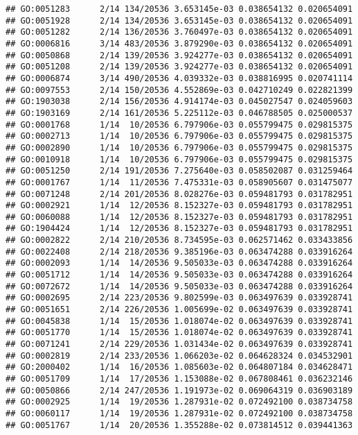 \documentclass[
]{article}
\begin{document}
\begin{verbatim}
## GO:0051283      2/14 134/20536 3.653145e-03 0.038654132 0.020654091
## GO:0051928      2/14 134/20536 3.653145e-03 0.038654132 0.020654091
## GO:0051282      2/14 136/20536 3.760497e-03 0.038654132 0.020654091
## GO:0006816      3/14 483/20536 3.879290e-03 0.038654132 0.020654091
## GO:0050868      2/14 139/20536 3.924277e-03 0.038654132 0.020654091
## GO:0051208      2/14 139/20536 3.924277e-03 0.038654132 0.020654091
## GO:0006874      3/14 490/20536 4.039332e-03 0.038816995 0.020741114
## GO:0097553      2/14 150/20536 4.552869e-03 0.042710249 0.022821399
## GO:1903038      2/14 156/20536 4.914174e-03 0.045027547 0.024059603
## GO:1903169      2/14 161/20536 5.225112e-03 0.046788505 0.025000537
## GO:0001768      1/14  10/20536 6.797906e-03 0.055799475 0.029815375
## GO:0002713      1/14  10/20536 6.797906e-03 0.055799475 0.029815375
## GO:0002890      1/14  10/20536 6.797906e-03 0.055799475 0.029815375
## GO:0010918      1/14  10/20536 6.797906e-03 0.055799475 0.029815375
## GO:0051250      2/14 191/20536 7.275640e-03 0.058502087 0.031259464
## GO:0001767      1/14  11/20536 7.475331e-03 0.058905607 0.031475077
## GO:0071248      2/14 201/20536 8.028276e-03 0.059481793 0.031782951
## GO:0002921      1/14  12/20536 8.152327e-03 0.059481793 0.031782951
## GO:0060088      1/14  12/20536 8.152327e-03 0.059481793 0.031782951
## GO:1904424      1/14  12/20536 8.152327e-03 0.059481793 0.031782951
## GO:0002822      2/14 210/20536 8.734595e-03 0.062571462 0.033433856
## GO:0022408      2/14 218/20536 9.385196e-03 0.063474288 0.033916264
## GO:0002093      1/14  14/20536 9.505033e-03 0.063474288 0.033916264
## GO:0051712      1/14  14/20536 9.505033e-03 0.063474288 0.033916264
## GO:0072672      1/14  14/20536 9.505033e-03 0.063474288 0.033916264
## GO:0002695      2/14 223/20536 9.802599e-03 0.063497639 0.033928741
## GO:0051651      2/14 226/20536 1.005699e-02 0.063497639 0.033928741
## GO:0045838      1/14  15/20536 1.018074e-02 0.063497639 0.033928741
## GO:0051770      1/14  15/20536 1.018074e-02 0.063497639 0.033928741
## GO:0071241      2/14 229/20536 1.031434e-02 0.063497639 0.033928741
## GO:0002819      2/14 233/20536 1.066203e-02 0.064628324 0.034532901
## GO:2000402      1/14  16/20536 1.085603e-02 0.064807184 0.034628471
## GO:0051709      1/14  17/20536 1.153088e-02 0.067808461 0.036232146
## GO:0050866      2/14 247/20536 1.191973e-02 0.069064319 0.036903189
## GO:0002925      1/14  19/20536 1.287931e-02 0.072492100 0.038734758
## GO:0060117      1/14  19/20536 1.287931e-02 0.072492100 0.038734758
## GO:0051767      1/14  20/20536 1.355288e-02 0.073814512 0.039441363

\end{verbatim}
\end{document}
